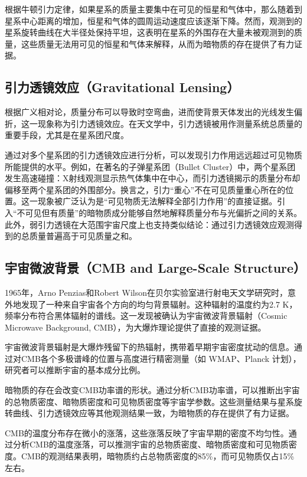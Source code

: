 根据牛顿引力定律，如果星系的质量主要集中在可见的恒星和气体中，那么随着到星系中心距离的增加，恒星和气体的圆周运动速度应该逐渐下降。然而，观测到的星系旋转曲线在大半径处保持平坦，这表明在星系的外围存在大量未被观测到的质量，这些质量无法用可见的恒星和气体来解释，从而为暗物质的存在提供了有力证据。

\subsection{引力透镜效应（Gravitational Lensing）}

根据广义相对论，质量分布可以导致时空弯曲，进而使背景天体发出的光线发生偏折，这一现象称为引力透镜效应。在天文学中，引力透镜被用作测量系统总质量的重要手段，尤其是在星系团尺度。

通过对多个星系团的引力透镜效应进行分析，可以发现引力作用远远超过可见物质所能提供的水平。例如，在著名的子弹星系团（Bullet Cluster）中，两个星系团发生高速碰撞：X射线观测显示热气体集中在中心，而引力透镜揭示的质量分布却偏移至两个星系团的外围部分。换言之，引力“重心”不在可见质量重心所在的位置。这一现象被广泛认为是“可见物质无法解释全部引力作用”的直接证据。引入“不可见但有质量”的暗物质成分能够自然地解释质量分布与光偏折之间的关系。此外，弱引力透镜在大范围宇宙尺度上也支持类似结论：通过引力透镜效应观测得到的总质量普遍高于可见质量之和。

\subsection{宇宙微波背景（CMB and Large-Scale Structure）}

1965年，Arno Penzias和Robert Wilson在贝尔实验室进行射电天文学研究时，意外地发现了一种来自宇宙各个方向的均匀背景辐射。这种辐射的温度约为2.7 K，频率分布符合黑体辐射的谱线。这一发现被确认为宇宙微波背景辐射（Cosmic Microwave Background, CMB），为大爆炸理论提供了直接的观测证据。

宇宙微波背景辐射是大爆炸残留下的热辐射，携带着早期宇宙密度扰动的信息。通过对CMB各个多极谱峰的位置与高度进行精密测量（如 WMAP、Planck 计划），研究者可以推断宇宙的基本成分比例。

暗物质的存在会改变CMB功率谱的形状。通过分析CMB功率谱，可以推断出宇宙的总物质密度、暗物质密度和可见物质密度等宇宙学参数。这些测量结果与星系旋转曲线、引力透镜效应等其他观测结果一致，为暗物质的存在提供了有力证据。

CMB的温度分布存在微小的涨落，这些涨落反映了宇宙早期的密度不均匀性。通过分析CMB的温度涨落，可以推测宇宙的总物质密度、暗物质密度和可见物质密度。CMB的观测结果表明，暗物质约占总物质密度的85\%，而可见物质仅占15\%左右。

\newpage
